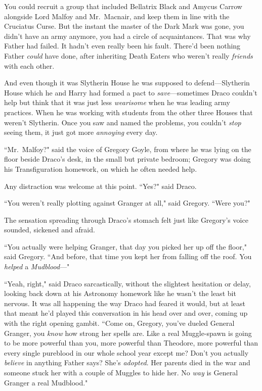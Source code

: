 You could recruit a group that included Bellatrix Black and Amycus Carrow alongside Lord Malfoy and Mr.~Macnair, and keep them in line with the Cruciatus Curse. But the instant the master of the Dark Mark was gone, you didn't have an army anymore, you had a circle of acquaintances. That was why Father had failed. It hadn't even really been his fault. There'd been nothing Father \emph{could} have done, after inheriting Death Eaters who weren't really \emph{friends} with each other.

And even though it was Slytherin House he was supposed to defend—Slytherin House which he and Harry had formed a pact to \emph{save}—sometimes Draco couldn't help but think that it was just less \emph{wearisome} when he was leading army practices. When he was working with students from the other three Houses that weren't Slytherin. Once you saw and named the problems, you couldn't \emph{stop} seeing them, it just got more \emph{annoying} every day.

``Mr.~Malfoy?" said the voice of Gregory Goyle, from where he was lying on the floor beside Draco's desk, in the small but private bedroom; Gregory was doing his Transfiguration homework, on which he often needed help.

Any distraction was welcome at this point. ``Yes?" said Draco.

``You weren't really plotting against Granger at all," said Gregory. ``Were you?"

The sensation spreading through Draco's stomach felt just like Gregory's voice sounded, sickened and afraid.

``You actually were helping Granger, that day you picked her up off the floor," said Gregory. ``And before, that time you kept her from falling off the roof. You \emph{helped} a \emph{Mudblood}—"

``Yeah, right," said Draco sarcastically, without the slightest hesitation or delay, looking back down at his Astronomy homework like he wasn't the least bit nervous. It was all happening the way Draco had feared it would, but at least that meant he'd played this conversation in his head over and over, coming up with the right opening gambit. ``Come on, Gregory, you've dueled General Granger, you \emph{know} how strong her spells are. Like a real Muggle-spawn is going to be more powerful than you, more powerful than Theodore, more powerful than every single pureblood in our whole school year except me? Don't you actually \emph{believe} in anything Father says? She's \emph{adopted}. Her parents died in the war and someone stuck her with a couple of Muggles to hide her. No \emph{way} is General Granger a real Mudblood."

